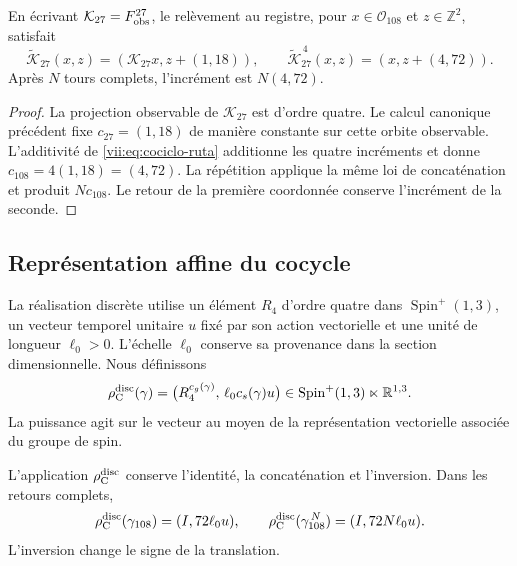 \begin{proposition}
\label{vii:prop:memoria-vuelta-completa}
En écrivant \(\mathcal K_{27}=F_{\rm obs}^{27}\), le relèvement
au registre, pour \(x\in\mathcal O_{108}\) et \(z\in\mathbb Z^2\), satisfait
\[
 \widetilde{\mathcal K}_{27}(x,z)
   =(\mathcal K_{27}x,z+(1,18)),\qquad
 \widetilde{\mathcal K}_{27}^{\,4}(x,z)
   =(x,z+(4,72)).
\]
Après \(N\) tours complets, l'incrément est \(N(4,72)\).
\end{proposition}

\begin{proof}
La projection observable de \(\mathcal K_{27}\) est d'ordre quatre. Le calcul canonique précédent fixe \(c_{27}=(1,18)\) de manière constante sur cette orbite observable. L'additivité de \eqref{vii:eq:cociclo-ruta} additionne les quatre incréments et donne \(c_{108}=4(1,18)=(4,72)\). La répétition applique la même loi de concaténation et produit \(Nc_{108}\). Le retour de la première coordonnée conserve l'incrément de la seconde.
\end{proof}

\subsection{Représentation affine du cocycle}
\label{vii:subsec:representacion-afin-cociclo}

La réalisation discrète utilise un élément \(R_4\) d'ordre quatre dans
\(\operatorname{Spin}^+(1,3)\), un vecteur temporel unitaire \(u\)
fixé par son action vectorielle et une unité de longueur \(\ell_0>0\).
L'échelle \(\ell_0\) conserve sa provenance dans la section dimensionnelle.
Nous définissons
\begin{equation}
 \rho_{\rm C}^{\rm disc}(\gamma)=
 \bigl(R_4^{c_g(\gamma)},\,\ell_0c_s(\gamma)u\bigr)
 \in\operatorname{Spin}^+(1,3)\ltimes\mathbb R^{1,3}.
 \label{vii:eq:representacion-discreta-memoria}
\end{equation}
La puissance agit sur le vecteur au moyen de la représentation vectorielle
associée du groupe de spin.

\begin{theorem}
\label{vii:thm:traslacion-memoria}
L'application \(\rho_{\rm C}^{\rm disc}\) conserve l'identité,
la concaténation et l'inversion. Dans les retours complets,
\begin{equation}
 \rho_{\rm C}^{\rm disc}(\gamma_{108})=(I,72\ell_0u),\qquad
 \rho_{\rm C}^{\rm disc}(\gamma_{108}^{\,N})=(I,72N\ell_0u).
 \label{vii:eq:traslacion-retorno-108}
\end{equation}
L'inversion change le signe de la translation.
\end{theorem}

